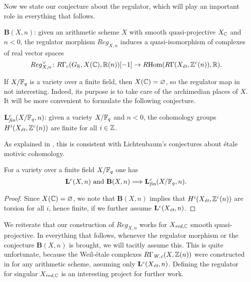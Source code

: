 \documentclass{article}
\numberwithin{equation}{section}
\begin{document}
Now we state our conjecture about the regulator, which will play an important
role in everything that follows.

\begin{conjecture}
  $\mathbf{B} (X,n)$: given an arithmetic scheme $X$ with smooth
  quasi-projective $X_\CC$ and $n < 0$, the regulator morphism $Reg_{X,n}$
  induces a quasi-isomorphism of complexes of real vector spaces
  \[ Reg_{X,n}^\vee\colon R\Gamma_c (G_\RR, X (\CC), \RR (n)) [-1] \to
    \RHom (R\Gamma (X_\et, \ZZ^c (n)), \RR). \]
\end{conjecture}

If $X/\FF_q$ is a variety over a finite field, then $X (\CC) = \emptyset$,
so the regulator map in not interesting. Indeed, its purpose is to take care
of the archimedian places of $X$. It will be more convenient to formulate the
following conjecture.

\begin{conjecture}
  $\mathbf{L}_\fin^c (X/\FF_q,n)$: given a variety $X/\FF_q$ and $n < 0$,
  the cohomology groups $H^i (X_\et, \ZZ^c (n))$ are finite for all $i \in \ZZ$.
\end{conjecture}

As explained in \cite[\S 8]{Beshenov-Weil-etale-1}, this is consistent with
Lichtenbaum's conjectures about étale motivic cohomology.

\begin{lemma}
  For a variety over a finite field $X/\FF_q$ one has
  \[ \mathbf{L}^c (X,n) \text{ and } \mathbf{B} (X,n)
    \Longrightarrow \mathbf{L}_\fin^c (X/\FF_q,n). \]

  \begin{proof}
    Since $X (\CC) = \emptyset$, we note that $\mathbf{B} (X,n)$ implies that
    $H^i (X_\et, \ZZ^c (n))$ are torsion for all $i$, hence finite, if we
    further assume $\mathbf{L}^c (X_\et,n)$.
  \end{proof}
\end{lemma}

\begin{remark}
  \label{rmk:regulator-is-defined-for-XC-smooth-quasi-proj}
  We reiterate that our construction of $Reg_{X,n}$ works for $X_{\red,\CC}$
  smooth quasi-projective. In everything that follows, whenever the regulator
  morphism or the conjecture $\mathbf{B} (X,n)$ is brought, we will tacitly
  assume this.  This is quite unfortunate, because the Weil-étale complexes
  $R\Gamma_\Wc (X, \ZZ(n))$ were constructed in \cite{Beshenov-Weil-etale-1} for
  any arithmetic scheme, assuming only $\mathbf{L}^c (X_\et,n)$. Defining the
  regulator for singular $X_{\red,\CC}$ is an interesting project for further
  work.
\end{remark}
\end{document}
